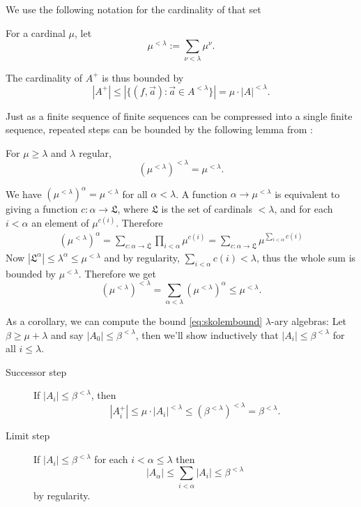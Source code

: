 We use the following notation for the cardinality of that set
\begin{Definition}
For a cardinal $\mu$, let
\[ \mu^{< \lambda} := \sum_{\nu < \lambda} \mu^\nu. \]
\end{Definition}

The cardinality of $A^+$ is thus bounded by
\[ |A^+| \leq |\{ (f,\vec a) : \vec a \in A^{< \lambda} \}| = \mu \cdot |A|^{< \lambda}. \]

Just as a finite sequence of finite sequences can be compressed into a single finite sequence, repeated steps can be bounded by the following lemma from \cite[\nopp~2.10]{AdamekRosicky}:

\begin{Lemma}
For $\mu \geq \lambda$ and $\lambda$ regular, 
\[ \left(\mu^{< \lambda}\right)^{< \lambda} = \mu^{< \lambda}. \]
\end{Lemma}
\begin{Proof}
We have $(\mu^{< \lambda})^\alpha = \mu^{< \lambda}$ for all $\alpha < \lambda$. A function $\alpha \to \mu^{< \lambda}$ is equivalent to giving a function $c : \alpha \to \mathfrak L$, where $\mathfrak L$ is the set of cardinals $< \lambda$, and for each $i< \alpha$ an element of $\mu^{c(i)}$. Therefore 
\begin{align*}
(\mu^{< \lambda})^\alpha = \sum_{c : \alpha \to \mathfrak L} \prod_{i < \alpha} \mu^{c(i)} 
= \sum_{c : \alpha \to \mathfrak L} \mu^{\sum_{i < \alpha} c(i)}
\end{align*}
Now $|\mathfrak L^\alpha| \leq \lambda^\alpha \leq \mu^{< \lambda}$ and by regularity, $\sum_{i < \alpha} c(i) < \lambda$, thus the whole sum is bounded by $\mu^{< \lambda}$. Therefore we get
\[ (\mu^{< \lambda})^{< \lambda} = \sum_{\alpha < \lambda} (\mu^{< \lambda})^\alpha \leq \mu^{< \lambda}. \]
\end{Proof}

As a corollary, we can compute the bound \eqref{eq:skolembound} $\lambda$-ary algebras: Let $\beta \geq \mu + \lambda$ and say $|A_0| \leq \beta^{< \lambda}$, then we'll show inductively that $|A_i| \leq \beta^{< \lambda}$ for all $i \leq \lambda$.
\begin{description}
\item[Successor step] If $|A_i| \leq \beta^{< \lambda}$, then
\[ |A_i^+| \leq \mu \cdot |A_i|^{< \lambda} \leq \left(\beta^{< \lambda}\right)^{< \lambda} = \beta^{< \lambda}. \]
\item[Limit step] If $|A_i| \leq \beta^{< \lambda}$ for each $i < \alpha \leq \lambda$ then
\[ |A_\alpha| \leq \sum_{i < \alpha} |A_i| \leq \beta^{< \lambda} \]
by regularity.
\end{description}

